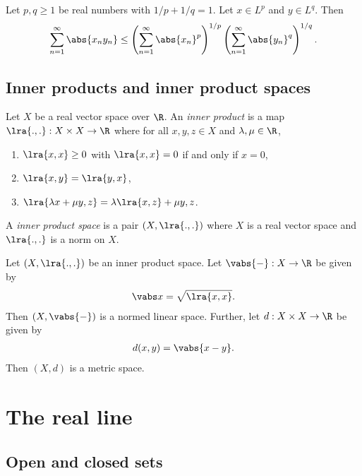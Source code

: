 \documentclass{article}
\begin{document}
\begin{lemma}
    Let $p,q\geq 1$ be real numbers with $1/p+1/q=1$. Let $x\in L^p$ and $y\in L^q$. Then 
    \begin{align*}
        \sum_{n=1}^\infty \abs{x_ny_n}\leq 
        \left(\sum_{n=1}^\infty\abs{x_n}^p\right)^{1/p}
        \left(\sum_{n=1}^\infty\abs{y_n}^q\right)^{1/q}.
    \end{align*}
\end{lemma}

\subsection{Inner products and inner product spaces}

\begin{definition}
    Let $X$ be a real vector space over $\R$. An \emph{inner product}
    is a map $\lra{.,.}:X\times X\to\R$ where for all $x,y,z\in X$ and 
    $\lambda,\mu\in\R$,
    \begin{enumerate}
        \item $\lra{x,x}\geq 0$ with $\lra{x,x}=0$ if and only if $x=0$,
        \item $\lra{x,y}=\lra{y,x}$,
        \item $\lra{\lambda x+\mu y,z}=\lambda\lra{x,z}+\mu{y,z}$.
    \end{enumerate} 
    A \emph{inner product space} is a pair $(X, \lra{.,.})$ where $X$ is a real 
    vector space and $\lra{.,.}$ is a norm on $X$.
\end{definition}

\begin{lemma}
    Let $(X,\lra{.,.})$ be an inner product space. Let $\vabs{-}:X\to\R$ be given 
    by 
    \begin{align*}
        \vabs x = \sqrt{\lra{x,x}}.
    \end{align*}
    Then $(X,\vabs{-})$ is a normed linear space. Further, let $d:X\times X\to\R$
    be given by 
    \begin{align*}
        d(x,y)=\vabs{x-y}.
    \end{align*}
    Then $(X,d)$ is a metric space.
\end{lemma}

\section{The real line}

\subsection{Open and closed sets}
\end{document}
